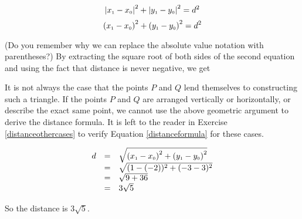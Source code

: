  \[ \left|x_{\mbox{\tiny$1$}} - x_{\mbox{\tiny$0$}}\right|^2 + \left|y_{\mbox{\tiny$1$}} - y_{\mbox{\tiny$0$}}\right|^2 = d^2\]
 \[ \left(x_{\mbox{\tiny$1$}} - x_{\mbox{\tiny$0$}}\right)^2 + \left(y_{\mbox{\tiny$1$}} - y_{\mbox{\tiny$0$}}\right)^2 = d^2\]
 
(Do you remember why we can replace the absolute value notation with parentheses?)  By extracting the square root of both sides of the second equation and using the fact that distance is never negative, we get
 
\medskip
 

\medskip

It is not always the case that the points $P$ and $Q$ lend themselves to constructing such a triangle.  If the points $P$ and $Q$ are arranged vertically or horizontally, or describe the exact same point, we cannot use the above geometric argument to derive the distance formula.  It is left to the reader in Exercise \ref{distanceothercases} to verify Equation \ref{distanceformula} for these cases.

\medskip

{
\[ \begin{array}{rcl}

 d & = & \sqrt{\left(x_{\mbox{\tiny$1$}} - x_{\mbox{\tiny$0$}} \right)^2 + \left(y_{\mbox{\tiny$1$}} - y_{\mbox{\tiny$0$}} \right)^2} \\
   & = & \sqrt{ (1-(-2))^2 + (-3-3)^2} \\
   & = & \sqrt{9 + 36} \\
   & = & 3 \sqrt{5} \end{array} \]

So the distance is $3 \sqrt{5}$. 
}

\medskip

